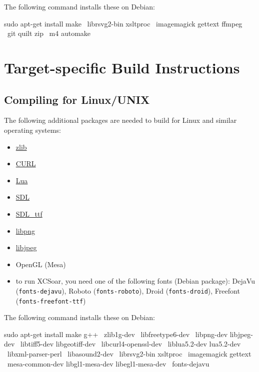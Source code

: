 The following command installs these on Debian:

\begin{verbatim*}
sudo apt-get install make \
  librsvg2-bin xsltproc \
  imagemagick gettext ffmpeg \
  git quilt zip \
  m4 automake
\end{verbatim*}

\section{Target-specific Build Instructions}

\subsection{Compiling for Linux/UNIX}

The following additional packages are needed to build for Linux and
similar operating systems:

\begin{itemize}
\item \href{http://www.zlib.net/}{zlib}
\item \href{http://curl.haxx.se/}{CURL}
\item \href{http://www.lua.org/}{Lua}
\item \href{http://www.libsdl.org/}{SDL}
\item \href{http://www.libsdl.org/projects/SDL\_ttf/}{SDL\_ttf}
\item \href{http://www.libpng.org/}{libpng}
\item \href{http://libjpeg.sourceforge.net/}{libjpeg}
\item OpenGL (Mesa)
\item to run XCSoar, you need one of the following fonts (Debian
  package): DejaVu (\texttt{fonts-dejavu}),
  Roboto (\texttt{fonts-roboto}),
  Droid (\texttt{fonts-droid}),
  Freefont (\texttt{fonts-freefont-ttf})
\end{itemize}

The following command installs these on Debian:

\begin{verbatim*}
sudo apt-get install make g++ \
  zlib1g-dev \
  libfreetype6-dev \
  libpng-dev libjpeg-dev \
  libtiff5-dev libgeotiff-dev \
  libcurl4-openssl-dev \
  liblua5.2-dev lua5.2-dev \
  libxml-parser-perl \
  libasound2-dev \
  librsvg2-bin xsltproc \
  imagemagick gettext \
  mesa-common-dev libgl1-mesa-dev libegl1-mesa-dev \
  fonts-dejavu
\end{verbatim*}

